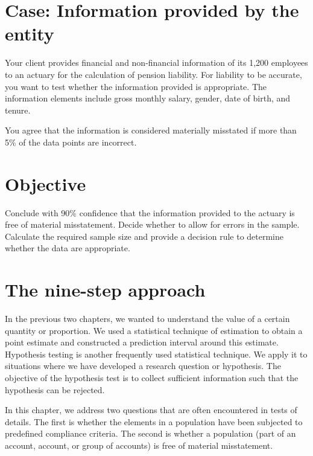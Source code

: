 \begin{mdframed}[hidealllines=true,backgroundcolor=KPMG_blue!10]
\section*{Case: Information provided by the entity}
Your client provides financial and non-financial information of its 1,200 employees to an actuary for the calculation of pension liability. For liability to be accurate, you want to test whether the information provided is appropriate. The information elements include gross monthly salary, gender, date of birth, and tenure. 

You agree that the information is considered materially misstated if more than 5\% of the data points are incorrect.

\section*{Objective}
\sloppy
Conclude with 90\% confidence that the information provided to the actuary is free of material misstatement. Decide whether to allow for errors in the sample. Calculate the required sample size and provide a decision rule to determine whether the data are appropriate.

\end{mdframed}

\section{The nine-step approach} %
\label{sec:the_nine_step_approach}
In the previous two chapters, we wanted to understand the value of a certain quantity or proportion. We used a statistical technique of estimation to obtain a point estimate and constructed a prediction interval around this estimate. Hypothesis testing is another frequently used statistical technique. We apply it to situations where we have developed a research question or hypothesis. The objective of the hypothesis test is to collect sufficient information such that the hypothesis can be rejected. 

In this chapter, we address two questions that are often encountered in tests of details. The first is whether the elements in a population have been subjected to predefined compliance criteria. The second is whether a population (part of an account, account, or group of accounts) is free of material misstatement.

